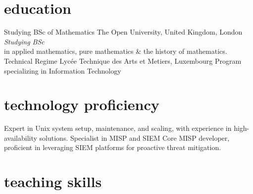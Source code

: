 \documentclass[]{friggeri-cv} %
\begin{document}

\section{education}
\begin{entrylist}
{Studying BSc {\normalfont of Mathematics}}
{The Open University, United Kingdom, London}
{\emph{Studying BSc} \\ in applied mathematics, pure mathematics \& the history of mathematics.}
{Technical Regime}
{Lyc\'{e}e Technique des Arts et Metiers, Luxembourg}
{Program specializing in Information Technology}
\end{entrylist}


\section{technology proficiency}
\begin{entrylist}
{}
{Expert in Unix system setup, maintenance, and scaling, with experience in high-availability solutions.}
{Specialist in MISP and SIEM}
{}
{Core MISP developer, proficient in leveraging SIEM platforms for proactive threat mitigation.}
\end{entrylist}


\section{teaching skills}
\end{document}

